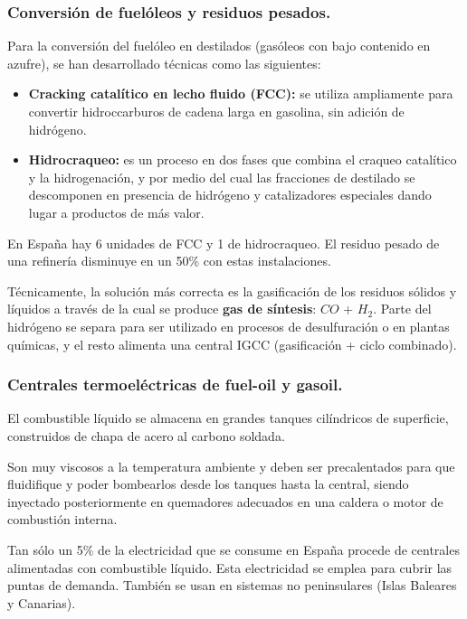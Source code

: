 \begin{enumerate}
			\end{enumerate} 
		
		\subsubsection{Conversión de fuelóleos y residuos pesados.}
			Para la conversión del fuelóleo en destilados (gasóleos con bajo contenido en azufre), se han
			desarrollado técnicas como las siguientes:
			\begin{itemize}
				\item \textbf{Cracking catalítico en lecho fluido (FCC):} se utiliza ampliamente para convertir hidroccarburos de cadena larga en gasolina, sin adición de hidrógeno.
				\item \textbf{Hidrocraqueo:} es un proceso en dos fases que combina el craqueo catalítico y la
				hidrogenación, y por medio del cual las fracciones de destilado se descomponen en presencia de
				hidrógeno y catalizadores especiales dando lugar a productos de más valor.
			\end{itemize}
			
			
			En España hay 6 unidades de FCC y 1 de hidrocraqueo. El residuo pesado de una refinería disminuye en un 50\% con estas instalaciones.
			
			
			Técnicamente, la solución más correcta es la gasificación de los residuos sólidos y líquidos a través de la cual se produce \textbf{gas de síntesis}: $CO$ + $H_2$. Parte del hidrógeno se separa para ser utilizado en procesos de desulfuración o en plantas químicas, y el resto alimenta una central IGCC (gasificación + ciclo combinado).
			
		\subsubsection{Centrales termoeléctricas de fuel-oil y gasoil.}
			El combustible líquido se almacena en grandes tanques
			cilíndricos de superficie, construidos de chapa de acero
			al carbono soldada.
			
			
			Son muy viscosos a la temperatura ambiente y deben
			ser precalentados para que fluidifique y poder
			bombearlos desde los tanques hasta la central, siendo
			inyectado posteriormente en quemadores adecuados en
			una caldera o motor de combustión interna.
			
			
			Tan sólo un 5\% de la electricidad que se consume en
			España procede de centrales alimentadas con
			combustible líquido. Esta electricidad se emplea para cubrir las puntas de
			demanda. También se usan en sistemas no peninsulares (Islas Baleares y Canarias).
			
